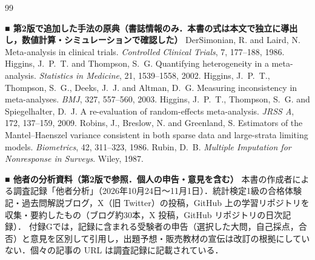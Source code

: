 \documentclass[a4paper,11pt,openany]{ltjsbook}
\begin{document}
\begin{thebibliography}{99}
\item[] \textbf{■ 第2版で追加した手法の原典（書誌情報のみ．本書の式は本文で独立に導出し，数値計算・シミュレーションで確認した）}
 DerSimonian, R. and Laird, N. Meta-analysis in clinical trials. \textit{Controlled Clinical Trials}, 7, 177--188, 1986.
 Higgins, J.~P.~T. and Thompson, S.~G. Quantifying heterogeneity in a meta-analysis. \textit{Statistics in Medicine}, 21, 1539--1558, 2002.
 Higgins, J.~P.~T., Thompson, S.~G., Deeks, J.~J. and Altman, D.~G. Measuring inconsistency in meta-analyses. \textit{BMJ}, 327, 557--560, 2003.
 Higgins, J.~P.~T., Thompson, S.~G. and Spiegelhalter, D.~J. A re-evaluation of random-effects meta-analysis. \textit{JRSS A}, 172, 137--159, 2009.
 Robins, J., Breslow, N. and Greenland, S. Estimators of the Mantel--Haenszel variance consistent in both sparse data and large-strata limiting models. \textit{Biometrics}, 42, 311--323, 1986.
 Rubin, D.~B. \textit{Multiple Imputation for Nonresponse in Surveys}. Wiley, 1987.

\item[] \textbf{■ 他者の分析資料（第2版で参照．個人の申告・意見を含む）}
 本書の作成者による調査記録「他者分析」（2026年10月24日〜11月1日）．統計検定1級の合格体験記・過去問解説ブログ，X（旧 Twitter）の投稿，GitHub 上の学習リポジトリを収集・要約したもの（ブログ約30本，X 投稿，GitHub リポジトリの日次記録）．
      付録Gでは，記録に含まれる受験者の申告（選択した大問，自己採点，合否）と意見を区別して引用し，出題予想・販売教材の宣伝は改訂の根拠にしていない．個々の記事の URL は調査記録に記載されている．
\end{thebibliography}
\end{document}
